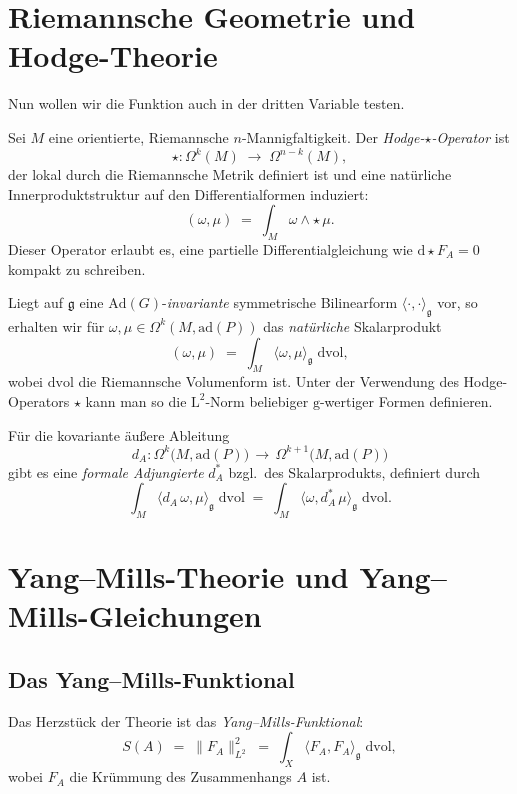 \documentclass[10pt, letterpaper]{article}
\begin{document}
\section{Riemannsche Geometrie und Hodge-Theorie}

Nun wollen wir die Funktion auch in der dritten Variable testen.

\begin{definition}
Sei \(M\) eine orientierte, Riemannsche \(n\)-Mannigfaltigkeit. Der \emph{Hodge-\(\star\)-Operator} ist
\[
\star: \Omega^k(M) \;\longrightarrow\; \Omega^{n-k}(M),
\]
der lokal durch die Riemannsche Metrik definiert ist und eine natürliche Innerproduktstruktur auf den Differentialformen induziert:
\[
(\omega,\mu) \;=\; \int_M \omega \wedge \star \,\mu.
\]
Dieser Operator erlaubt es, eine partielle Differentialgleichung wie \(\mathrm{d}\star F_A = 0\) kompakt zu schreiben.
\end{definition}

\begin{definition}
Liegt auf \(\mathfrak{g}\) eine \(\mathrm{Ad}(G)\)-\emph{invariante} symmetrische Bilinearform \(\langle\cdot,\cdot\rangle_{\mathfrak{g}}\) vor, so erhalten wir für \(\omega, \mu \in \Omega^k(M,\mathrm{ad}(P))\) das \emph{natürliche} Skalarprodukt
\[
(\omega,\mu)
\;=\;
\int_M \langle \omega, \mu\rangle_{\mathfrak{g}} \;\mathrm{dvol},
\]
wobei \(\mathrm{dvol}\) die Riemannsche Volumenform ist. Unter der Verwendung des Hodge-Operators \(\star\) kann man so die \(\mathrm{L}^2\)-Norm beliebiger \(\mathrm{g}\)-wertiger Formen definieren.
\end{definition}


\begin{definition}
Für die kovariante äußere Ableitung
\[
d_A: \Omega^k\bigl(M,\mathrm{ad}(P)\bigr)\,\to\,\Omega^{k+1}\bigl(M,\mathrm{ad}(P)\bigr)
\]
gibt es eine \emph{formale Adjungierte} \(d_A^*\) bzgl.\ des Skalarprodukts, definiert durch
\[
\int_M \langle d_A \,\omega, \mu\rangle_{\mathfrak{g}}\;\mathrm{dvol}
\;=\;
\int_M \langle \omega, d_A^* \,\mu\rangle_{\mathfrak{g}}\;\mathrm{dvol}.
\]
\end{definition}


\section{Yang--Mills-Theorie und Yang--Mills-Gleichungen}

\subsection{Das Yang--Mills-Funktional}
Das Herzstück der Theorie ist das \emph{Yang--Mills-Funktional}:
\[
S(A)
\;=\;
\| F_A\|_{L^2}^2 
\;=\;
\int_X 
\langle F_A, F_A \rangle_{\mathfrak{g}}
\;\mathrm{dvol},
\]
wobei \(F_A\) die Krümmung des Zusammenhangs \(A\) ist.
\end{document}
